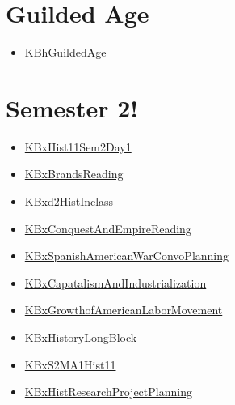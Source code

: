 \documentclass[letterpaper]{article}
\begin{document}
\section{Guilded Age}
\label{sec:orgb2f44d2}
\begin{itemize}
\item \href{KBhGuildedAge.org}{KBhGuildedAge}
\end{itemize}

\section{Semester 2!}
\label{sec:org9608c1c}
\begin{itemize}
\item \href{KBxHist11Sem2Day1.org}{KBxHist11Sem2Day1}
\item \href{KBxBrandsReading.org}{KBxBrandsReading}
\item \href{KBxd2HistInclass.org}{KBxd2HistInclass}
\item \href{KBxConquestAndEmpireReading.org}{KBxConquestAndEmpireReading}
\item \href{KBxSpanishAmericanWarConvoPlanning.org}{KBxSpanishAmericanWarConvoPlanning}
\item \href{KBxCapatalismAndIndustrialization.org}{KBxCapatalismAndIndustrialization}
\item \href{KBxGrowthofAmericanLaborMovement.org}{KBxGrowthofAmericanLaborMovement}
\item \href{KBxHistoryLongBlock.org}{KBxHistoryLongBlock}
\item \href{KBxS2MA1Hist11.org}{KBxS2MA1Hist11}
\item \href{KBxHistResearchProjectPlanning.org}{KBxHistResearchProjectPlanning}
\end{itemize}
\end{document}
